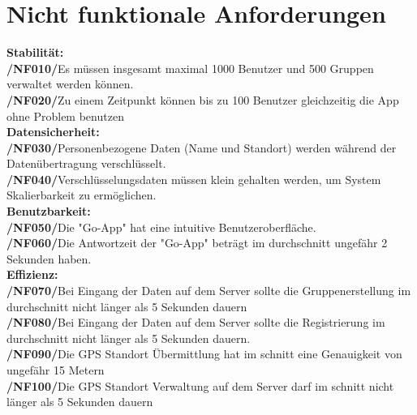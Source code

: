 \section{Nicht funktionale Anforderungen}
  
\textbf{Stabilität:}\\
\textbf{/NF010/}Es müssen insgesamt maximal 1000 Benutzer und 500 Gruppen verwaltet werden können. \\
\textbf{/NF020/}Zu einem Zeitpunkt können bis zu 100 Benutzer gleichzeitig die App ohne Problem benutzen \\

\textbf{Datensicherheit:}\\
\textbf{/NF030/}Personenbezogene Daten (Name und Standort) werden während der Datenübertragung verschlüsselt.\\
\textbf{/NF040/}Verschlüsselungsdaten müssen klein gehalten werden, um System Skalierbarkeit zu ermöglichen.\\

\textbf{Benutzbarkeit:}\\
\textbf{/NF050/}Die "Go-App" hat eine intuitive Benutzeroberfläche.\\
\textbf{/NF060/}Die Antwortzeit der "Go-App" beträgt im durchschnitt ungefähr 2 Sekunden haben.\\

\textbf{Effizienz:}\\
\textbf{/NF070/}Bei Eingang der Daten auf dem Server sollte die Gruppenerstellung im durchschnitt nicht länger als 5 Sekunden dauern\\
\textbf{/NF080/}Bei Eingang der Daten auf dem Server sollte die Registrierung im durchschnitt nicht länger als 5 Sekunden dauern.\\
\textbf{/NF090/}Die GPS Standort Übermittlung hat im schnitt eine Genauigkeit von ungefähr 15 Metern \\
\textbf{/NF100/}Die GPS Standort Verwaltung auf dem Server darf im schnitt nicht länger als 5 Sekunden dauern  \\
